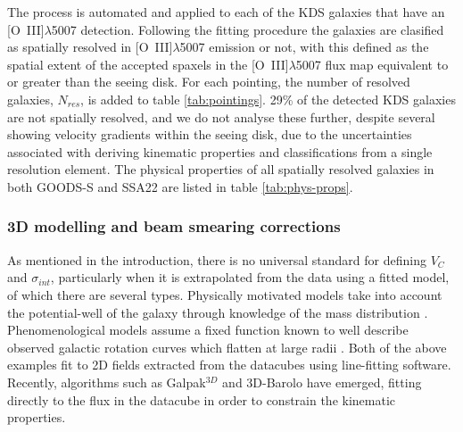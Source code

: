 \documentclass[fleqn,usenatbib]{mn2e}
\begin{document}
The process is automated and applied to each of the KDS galaxies that have an [O~{\sc III}]$\lambda$5007 detection.
Following the fitting procedure the galaxies are clasified as spatially resolved in [O~{\sc III}]$\lambda$5007 emission or not, with this defined as  the spatial extent of the accepted spaxels in the [O~{\sc III}]$\lambda$5007 flux map equivalent to or greater than the seeing disk.
For each pointing, the number of resolved galaxies, $N_{res}$, is added to table \ref{tab:pointings}.
29\% of the detected KDS galaxies are not spatially resolved, and we do not analyse these further, despite several showing velocity gradients within the seeing disk, due to the uncertainties associated with deriving kinematic properties and classifications from a single resolution element.
The physical properties of all spatially resolved galaxies in both GOODS-S and SSA22 are listed in table \ref{tab:phys-props}.

\subsubsection{3D modelling and beam smearing corrections}\label{subsec:3d_modelling}

As mentioned in the introduction, there is no universal standard for defining $V_{C}$ and $\sigma_{int}$, particularly when it is extrapolated from the data using a fitted model, of which there are several types.
Physically motivated models take into account the potential-well of the galaxy through knowledge of the mass distribution \citep[e.g.][]{Genzel2008,ForsterSchreiber2009,Gnerucci2011,Wisnioski2015}.
Phenomenological models assume a fixed function known to well describe observed galactic rotation curves which flatten at large radii \citep[e.g.][]{Epinat2010,Epinat2012,Swinbank2012,Stott2016,Harrison2017}.
Both of the above examples fit to 2D fields extracted from the datacubes using line-fitting software.
Recently, algorithms such as Galpak$^{3D}$ \citep{Bouche2015} and 3D-Barolo \citep{DiTeodoro2015} have emerged, fitting directly to the flux in the datacube in order to constrain the kinematic properties.
\end{document}
